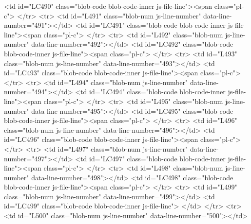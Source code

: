         <td id="LC490" class="blob-code blob-code-inner js-file-line"><span class="pl-c">%
      </tr>
      <tr>
        <td id="L491" class="blob-num js-line-number" data-line-number="491"></td>
        <td id="LC491" class="blob-code blob-code-inner js-file-line"><span class="pl-c">%
      </tr>
      <tr>
        <td id="L492" class="blob-num js-line-number" data-line-number="492"></td>
        <td id="LC492" class="blob-code blob-code-inner js-file-line"><span class="pl-c">%
      </tr>
      <tr>
        <td id="L493" class="blob-num js-line-number" data-line-number="493"></td>
        <td id="LC493" class="blob-code blob-code-inner js-file-line"><span class="pl-c">%
      </tr>
      <tr>
        <td id="L494" class="blob-num js-line-number" data-line-number="494"></td>
        <td id="LC494" class="blob-code blob-code-inner js-file-line"><span class="pl-c">%
      </tr>
      <tr>
        <td id="L495" class="blob-num js-line-number" data-line-number="495"></td>
        <td id="LC495" class="blob-code blob-code-inner js-file-line"><span class="pl-c">%
      </tr>
      <tr>
        <td id="L496" class="blob-num js-line-number" data-line-number="496"></td>
        <td id="LC496" class="blob-code blob-code-inner js-file-line"><span class="pl-c">%
      </tr>
      <tr>
        <td id="L497" class="blob-num js-line-number" data-line-number="497"></td>
        <td id="LC497" class="blob-code blob-code-inner js-file-line"><span class="pl-c">%
      </tr>
      <tr>
        <td id="L498" class="blob-num js-line-number" data-line-number="498"></td>
        <td id="LC498" class="blob-code blob-code-inner js-file-line"><span class="pl-c">%
      </tr>
      <tr>
        <td id="L499" class="blob-num js-line-number" data-line-number="499"></td>
        <td id="LC499" class="blob-code blob-code-inner js-file-line">
</td>
      </tr>
      <tr>
        <td id="L500" class="blob-num js-line-number" data-line-number="500"></td>
